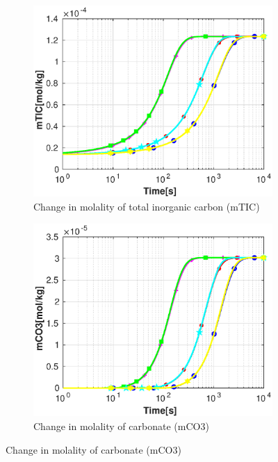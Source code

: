 \begin{figure}[!h]
    \hfill
    \begin{subfigure}{.5\linewidth}
            \centering
        \includegraphics[width=\textwidth]{PICTURES/dvm_pH6_mTIC.eps}
        \caption{Change in molality of total inorganic carbon (mTIC)}
        \label{fig:dvmpH6mTIC}
    \end{subfigure}%
    \hfill
    \begin{subfigure}{.5\linewidth}
            \centering
        \includegraphics[width=\textwidth]{PICTURES/dvm_pH6_mCO3.eps}
        \caption{Change in molality of carbonate (mCO3)}
        \label{fig:dvmpH6mCO3}
    \end{subfigure}%

\end{figure}
